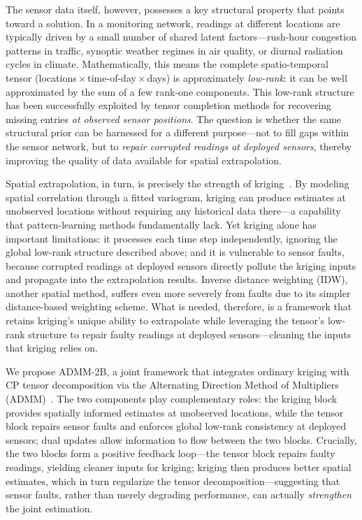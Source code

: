 \documentclass[journal]{IEEEtran}
\begin{document}
The sensor data itself, however, possesses a key structural property that points toward a solution. In a monitoring network, readings at different locations are typically driven by a small number of shared latent factors---rush-hour congestion patterns in traffic, synoptic weather regimes in air quality, or diurnal radiation cycles in climate. Mathematically, this means the complete spatio-temporal tensor (locations\,$\times$\,time-of-day\,$\times$\,days) is approximately \emph{low-rank}: it can be well approximated by the sum of a few rank-one components. This low-rank structure has been successfully exploited by tensor completion methods for recovering missing entries \emph{at observed sensor positions}. The question is whether the same structural prior can be harnessed for a different purpose---not to fill gaps within the sensor network, but to \emph{repair corrupted readings at deployed sensors}, thereby improving the quality of data available for spatial extrapolation.

Spatial extrapolation, in turn, is precisely the strength of kriging~\cite{cressie2015statistics}. By modeling spatial correlation through a fitted variogram, kriging can produce estimates at unobserved locations without requiring any historical data there---a capability that pattern-learning methods fundamentally lack. Yet kriging alone has important limitations: it processes each time step independently, ignoring the global low-rank structure described above; and it is vulnerable to sensor faults, because corrupted readings at deployed sensors directly pollute the kriging inputs and propagate into the extrapolation results. Inverse distance weighting (IDW), another spatial method, suffers even more severely from faults due to its simpler distance-based weighting scheme. What is needed, therefore, is a framework that retains kriging's unique ability to extrapolate while leveraging the tensor's low-rank structure to repair faulty readings at deployed sensors---cleaning the inputs that kriging relies on.

We propose ADMM-2B, a joint framework that integrates ordinary kriging with CP tensor decomposition via the Alternating Direction Method of Multipliers (ADMM)~\cite{boyd2011distributed}. The two components play complementary roles: the kriging block provides spatially informed estimates at unobserved locations, while the tensor block repairs sensor faults and enforces global low-rank consistency at deployed sensors; dual updates allow information to flow between the two blocks. Crucially, the two blocks form a positive feedback loop---the tensor block repairs faulty readings, yielding cleaner inputs for kriging; kriging then produces better spatial estimates, which in turn regularize the tensor decomposition---suggesting that sensor faults, rather than merely degrading performance, can actually \emph{strengthen} the joint estimation.
\end{document}
